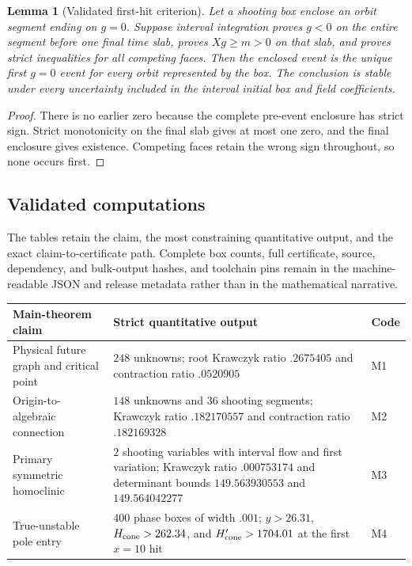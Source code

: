 \documentclass[11pt]{amsart}
\numberwithin{equation}{section}
\newtheorem{lemma}[theorem]{Lemma}
\theoremstyle{definition}
\theoremstyle{remark}
\begin{document}
\begin{lemma}[Validated first-hit criterion]\label{lem:app-first-hit-criterion}
Let a shooting box enclose an orbit segment ending on $g=0$.  Suppose
interval integration proves $g<0$ on the entire segment before one final
time slab, proves $Xg\ge m>0$ on that slab, and proves strict inequalities
for all competing faces.  Then the enclosed event is the unique
first $g=0$ event for every orbit represented by the box.  The conclusion
is stable under every uncertainty included in the interval initial box and
field coefficients.
\end{lemma}

\begin{proof}
There is no earlier zero because the complete pre-event enclosure has
strict sign.  Strict monotonicity on the final slab gives at most one zero,
and the final enclosure gives existence.  Competing faces retain the
wrong sign throughout, so none occurs first.
\end{proof}

\subsection{Validated computations}

The tables retain the claim, the most constraining quantitative output, and
the exact claim-to-certificate path.  Complete box counts, full certificate,
source, dependency, and bulk-output hashes, and toolchain pins remain in the
machine-readable JSON and release metadata rather than in the mathematical
narrative.

\begingroup
\small
\setlength{\tabcolsep}{3pt}
\renewcommand{\arraystretch}{1.18}
\begin{center}
\begin{tabularx}{\textwidth}
 {|>{\raggedright\arraybackslash}p{}|
   Y|
   >{\centering\arraybackslash}p{.06\textwidth}|}
\hline
Main-theorem claim & Strict quantitative output & Code\\
\hline
Physical future graph and critical point &
$248$ unknowns; root Krawczyk ratio $.2675405$ and contraction ratio
$.0520905$ &
M1\\
\hline
Origin-to-algebraic connection &
$148$ unknowns and $36$ shooting segments; Krawczyk ratio $.182170557$
and contraction ratio $.182169328$ &
M2\\
\hline
Primary symmetric homoclinic &
$2$ shooting variables with interval flow and first variation; Krawczyk
ratio $.000753174$ and determinant bounds
$149.563930553$ and $149.564042277$ &
M3\\
\hline
True-unstable pole entry &
$400$ phase boxes of width $.001$; $y>26.31$, $H_{\rm cone}>262.34$, and
$H_{\rm cone}'>1704.01$ at the first $x=10$ hit &
M4\\
\hline
\end{tabularx}
\end{center}
\endgroup
\end{document}
